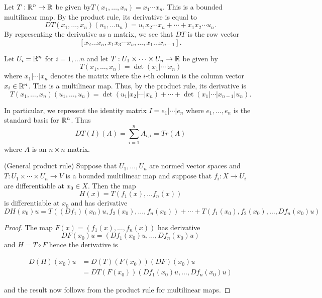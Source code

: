 \documentclass[twoside, a4paper, 10pt]{amsart}
\begin{document}
\begin{eg} \label{eg: product derivative} Let $T:\mathbb{R}^n \to \mathbb{R}$ be given by$T(x_1, \ldots, x_n) = x_1 \cdots x_n$. This is a bounded multilinear map. By the product rule, its derivative is equal to $$DT(x_1, \ldots, x_n)(u_1, \ldots u_n) = u_1x_2 \cdots x_n + \cdots + x_1x_2 \cdots u_n.$$ By representing the derivative as a matrix, we see that $DT$ is the row vector $$[x_2 \dots x_n, x_1x_3\cdots x_n, \ldots, x_1 \ldots x_{n-1}].$$

\end{eg}

\begin{eg} Let $U_i = \mathbb{R}^n$ for $i=1, \ldots n$ and let $T:U_1 \times \cdots \times U_n \to \mathbb{R}$ be given by $$T(x_1, \ldots, x_n) = \operatorname{det}(x_1 | \cdots | x_n)$$ where $x_1| \cdots |x_n$ denotes the matrix where the $i$-th column is the column vector $x_i \in \mathbb{R}^n$. This is a multilinear map. Thus, by the product rule, its derivative is $$T(x_1, \ldots, x_n)(u_1, \ldots, u_n) = \operatorname{det}(u_1 | x_2| \cdots |x_n) + \cdots + \operatorname{det}(x_1|\cdots |x_{n-1}|u_n).$$

In particular, we represent the identity matrix $I = e_1| \cdots | e_n$ where $e_1, \ldots, e_n$ is the standard basis for $\mathbb{R}^n$. Thus $$DT(I)(A) = \sum_{i=1}^n A_{i,i} = Tr(A)$$ where $A$ is an $n \times n$ matrix.

\end{eg}
\begin{lemma}(General product rule)  Suppose that $U_1, \ldots, U_n$ are normed vector spaces and $T: U_1 \times \cdots \times U_n \to V$ is a bounded multilinear map and suppose that $f_i:X \to U_i$ are differentiable at $x_0 \in X$. Then the map $$ H(x) = T(f_1(x), \ldots f_n(x)) $$ is differentiable at $x_0$ and has derivative $$DH(x_0)u = T((Df_1)(x_0)u, f_2(x_0), \ldots, f_n(x_0)) + \cdots + T(f_1(x_0), f_2(x_0), \ldots, Df_n(x_0)u)$$\end{lemma}

\begin{proof} The map $F(x)=(f_1(x), \ldots, f_n(x))$ has derivative $$DF(x_0)u =(Df_1(x_0)u, \ldots, Df_n(x_0)u)$$ and $H = T \circ F$ hence the derivative is 

\begin{align*} D(H)(x_0)u &= D(T)(F(x_0))(DF)(x_0)u \\ &= DT(F(x_0)) (Df_1(x_0)u, \ldots, Df_n(x_0)u)  \end{align*}

and the result now follows from the product rule for multilinear maps.

 \end{proof}
\end{document}
